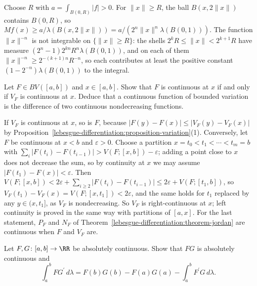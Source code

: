 \begin{solution}
Choose $R$ with $a = \int_{B(0, R)}|f| > 0$. For $\|x\| \geq R$, the ball $B(x, 2\|x\|)$ contains $B(0, R)$, so
$Mf(x) \geq a/\lambda(B(x, 2\|x\|)) = a/(2^n\|x\|^n\lambda(B(0, 1)))$. The function $\|x\|^{-n}$ is not integrable on $\{\|x\| \geq R\}$: the shells
$2^kR \leq \|x\| < 2^{k+1}R$ have measure $(2^n - 1)2^{kn}R^n\lambda(B(0, 1))$, and on each of them $\|x\|^{-n} \geq 2^{-(k+1)n}R^{-n}$, so each contributes at least the
positive constant $(1 - 2^{-n})\lambda(B(0, 1))$ to the integral.
\end{solution}

\begin{exercise}\label{lebesgue-differentiation:exercise-variation-continuous}
Let $F \in BV([a, b])$ and $x \in [a, b]$. Show that $F$ is continuous at $x$ if and only if $V_F$ is continuous at $x$. Deduce that a continuous function of bounded variation is the difference of two continuous
nondecreasing functions.
\end{exercise}

\begin{solution}
If $V_F$ is continuous at $x$, so is $F$, because $|F(y) - F(x)| \leq |V_F(y) - V_F(x)|$ by Proposition~\ref{lebesgue-differentiation:proposition-variation}(1). Conversely, let $F$ be continuous at $x < b$ and
$\varepsilon > 0$. Choose a partition $x = t_0 < t_1 < \cdots < t_m = b$ with $\sum_i|F(t_i) - F(t_{i-1})| > V(F; [x, b]) - \varepsilon$; adding a point close to $x$ does not decrease the sum, so by continuity at $x$
we may assume $|F(t_1) - F(x)| < \varepsilon$. Then $V(F; [x, b]) < 2\varepsilon + \sum_{i \geq 2}|F(t_i) - F(t_{i-1})| \leq 2\varepsilon + V(F; [t_1, b])$, so $V_F(t_1) - V_F(x) = V(F; [x, t_1]) < 2\varepsilon$, and the same
holds for $t_1$ replaced by any $y \in (x, t_1]$, as $V_F$ is nondecreasing. So $V_F$ is right-continuous at $x$; left continuity is proved in the same way with partitions of $[a, x]$. For the last statement,
$P_F$ and $N_F$ of Theorem~\ref{lebesgue-differentiation:theorem-jordan} are continuous when $F$ and $V_F$ are.
\end{solution}

\begin{exercise}\label{lebesgue-differentiation:exercise-integration-by-parts}
Let $F, G \colon [a, b] \to \RR$ be absolutely continuous. Show that $FG$ is absolutely continuous and
\[
\int_a^bFG^{\prime}\,d\lambda = F(b)G(b) - F(a)G(a) - \int_a^bF^{\prime}G\,d\lambda .
\]
\end{exercise}

